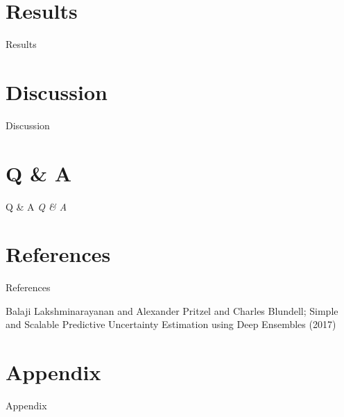 \documentclass{beamer}
\begin{document}
\section{Results}
\begin{frame}[t]{Results}
\end{frame}


\section{Discussion}
\begin{frame}[t]{Discussion}

\end{frame}

\section{Q \& A}

\begin{frame}[t]{Q \& A}
  \centering \Huge
  \emph{Q \& A}
\end{frame}

\section{References}

\begin{frame}[t]{References}

\begin{thebibliography}{1}

\alert{Balaji Lakshminarayanan and Alexander Pritzel and Charles Blundell; Simple and Scalable Predictive Uncertainty Estimation using Deep Ensembles (2017)}

\end{thebibliography}

\end{frame}

\section{Appendix}

\begin{frame}[t]{Appendix}

\end{frame}
\end{document}
